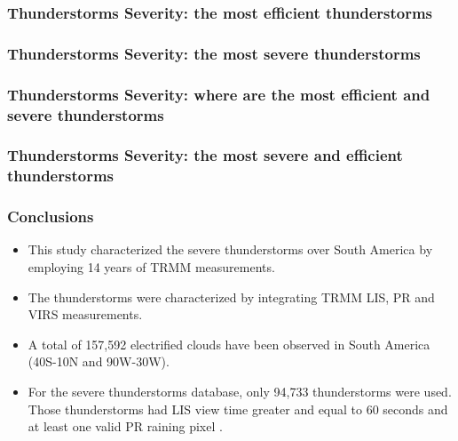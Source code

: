 \documentclass[smaller]{beamer}
\begin{document}
\begin{frame}
\frametitle{Thunderstorms Severity: {\normalsize the most efficient thunderstorms}}

\end{frame}

\begin{frame}
\frametitle{Thunderstorms Severity: the most severe thunderstorms}

\end{frame}


\begin{frame}
\frametitle{Thunderstorms Severity: where are the most efficient and severe thunderstorms}

\end{frame}

\begin{frame}
\frametitle{Thunderstorms Severity: the most severe and efficient thunderstorms}

\end{frame}


\begin{frame}
\frametitle{Conclusions}

\begin{itemize}
\item This study characterized the severe thunderstorms over South America by employing 14 years of TRMM measurements. 
\item The thunderstorms were characterized by integrating TRMM LIS, PR and VIRS measurements.
\item A total of 157,592 electrified clouds have been observed in South America (40S-10N and 90W-30W). 
\item  For the severe thunderstorms database, only 94,733 thunderstorms were used. Those thunderstorms had LIS view time greater and equal to 60 seconds and at least one valid PR raining pixel . 


\end{itemize}
\end{frame}
\end{document}
